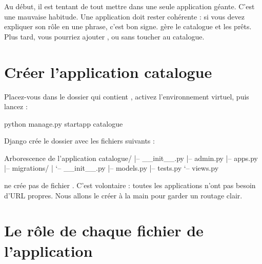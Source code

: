 Au début, il est tentant de tout mettre dans une seule application géante. C'est
une mauvaise habitude. Une application doit rester cohérente : si vous devez
expliquer son rôle en une phrase, c'est bon signe.  gère le
catalogue et les prêts. Plus tard, vous pourriez ajouter ,
 ou  sans toucher au catalogue.

\section{Créer l'application catalogue}

Placez-vous dans le dossier qui contient , activez
l'environnement virtuel, puis lancez :

\begin{terminal}
python manage.py startapp catalogue
\end{terminal}

Django crée le dossier  avec les fichiers suivants :

\begin{codebox}[tree]{Arborescence de l'application}
catalogue/
|-- __init__.py
|-- admin.py
|-- apps.py
|-- migrations/
|   `-- __init__.py
|-- models.py
|-- tests.py
`-- views.py
\end{codebox}

\begin{note}
 ne crée pas de fichier . C'est volontaire : toutes
les applications n'ont pas besoin d'URL propres. Nous allons le créer à la main
pour garder un routage clair.
\end{note}

\section{Le rôle de chaque fichier de l'application}

